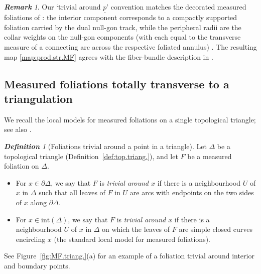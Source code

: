 \documentclass[11pt, letterpaper]{amsart}
\theoremstyle{definition}
\theoremstyle{remark}
\newtheorem{definition}[theorem]{\rm\bf Definition}
\newtheorem{remark}[theorem]{\rm\bf Remark}
\newcommand{\up}{\underline{p}}
\newcommand{\DEF}{} \newcommand{\WARN}{\textcolor{red}} \newcommand{\ALT}{\textcolor{brown}} \newcommand{\TODO}{\textcolor{teal}} %
\numberwithin{equation}{section}
\begin{document}
\begin{remark}
    Our `trivial around $\up$' convention matches the decorated measured foliations of \cite{PP93}: 
    the interior component corresponds to a compactly supported foliation carried by the dual null-gon track, while the peripheral radii are the collar weights on the null-gon components (with each equal to the transverse measure of a connecting arc across the respective foliated annulus) \cite[Sec. 2]{PP93}. 
    The resulting map \eqref{map:prod.str.MF} agrees with the fiber-bundle description in \cite[Prop. 2.2]{PP93}.
\end{remark}




     

\subsection{Measured foliations totally transverse to a triangulation}
    \label{subsec:MF.trans.triang.}



We recall the local models for measured foliations on a single topological triangle; see also \cite[Def.~3.9]{PT07}.

\begin{definition}[Foliations trivial around a point in a triangle]
    \label{def:MF.triv.pt}  
Let $\Delta$ be a topological triangle (Definition~\ref{def:top.triang.}), and let $F$ be a measured foliation on $\Delta$.  
\begin{itemize}
    \item For $x\in\partial\Delta$, we say that $F$ is \DEF{\em trivial around $x$} if there is a neighbourhood $U$ of $x$ in $\Delta$ such that all leaves of $F$ in $U$ are arcs with endpoints on the two sides of $x$ along $\partial\Delta$.
    \item For $x\in\mathrm{int}(\Delta)$, we say that $F$ is \DEF{\em trivial around $x$} if there is a neighbourhood $U$ of $x$ in $\Delta$ on which the leaves of $F$ are simple closed curves encircling $x$ (the standard local model for measured foliations).
\end{itemize}
\end{definition}

See Figure~\ref{fig:MF.triang.}(a) for an example of a foliation trivial around interior and boundary points.
\end{document}
